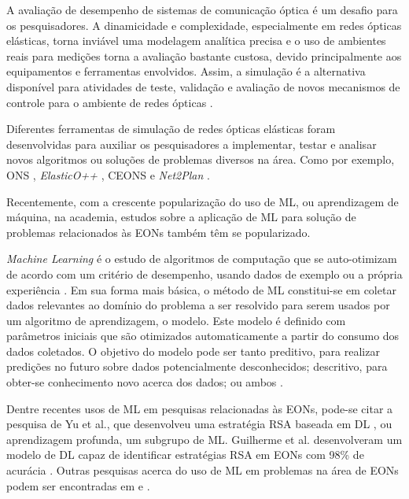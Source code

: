 A avaliação de desempenho de sistemas de comunicação óptica é um desafio para os pesquisadores. A dinamicidade e complexidade, especialmente em redes ópticas elásticas, torna inviável uma modelagem analítica precisa e o uso de ambientes reais para medições torna a avaliação bastante custosa, devido principalmente aos equipamentos e ferramentas envolvidos. Assim, a simulação é a alternativa disponível para atividades de teste, validação e avaliação de novos mecanismos de controle para o ambiente de redes ópticas \cite{costa2016ons}.

Diferentes ferramentas de simulação de redes ópticas elásticas foram desenvolvidas para auxiliar os pesquisadores a implementar, testar e analisar novos algoritmos ou soluções de problemas diversos na área. Como por exemplo, \acrfull{ONS} \cite{costa2016ons}, \textit{ElasticO++} \cite{TESSINARI201695}, \acrfull{CEONS} \cite{ceons2015} e \textit{Net2Plan} \cite{net2plan}.

Recentemente, com a crescente popularização do uso de \acrfull{ML}, ou aprendizagem de máquina, na academia, estudos sobre a aplicação de ML para solução de problemas relacionados às EONs também têm se popularizado.

\textit{Machine Learning} é o estudo de algoritmos de computação que se auto-otimizam de acordo com um critério de desempenho, usando dados de exemplo ou a própria experiência \cite{mitchell1997ml, alpaydin2020introduction}. Em sua forma mais básica, o método de ML constitui-se em coletar dados relevantes ao domínio do problema a ser resolvido para serem usados por um algoritmo de aprendizagem, o modelo. Este modelo é definido com parâmetros iniciais que são otimizados automaticamente a partir do consumo dos dados coletados. O objetivo do modelo pode ser tanto preditivo, para realizar predições no futuro sobre dados potencialmente desconhecidos; descritivo, para obter-se conhecimento novo acerca dos dados; ou ambos \cite{alpaydin2020introduction, brief_introduction_to_ml}.

Dentre recentes usos de ML em pesquisas relacionadas às EONs, pode-se citar a pesquisa de Yu et al., que desenvolveu uma estratégia RSA baseada em \acrfull{DL} \cite{eon_ml_rsa_dl_2019}, ou aprendizagem profunda, um subgrupo de ML. Guilherme et al. desenvolveram um modelo de DL capaz de identificar estratégias RSA em EONs com 98\% de acurácia \cite{eon_ml_classifier_2020}. Outras pesquisas acerca do uso de ML em problemas na área de EONs podem ser encontradas em \cite{eon_ml_recent_2019} e \cite{eon_ml_survey_2020}.

